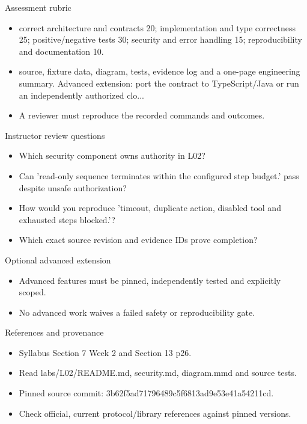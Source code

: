 \documentclass[aspectratio=169,10pt]{beamer}
\begin{document}
\begin{frame}{Assessment rubric}
\small
\begin{itemize}
\item correct architecture and contracts 20; implementation and type correctness 25; positive/negative tests 30; security and error handling 15; reproducibility and documentation 10.
\item source, fixture data, diagram, tests, evidence log and a one-page engineering summary. Advanced extension: port the contract to TypeScript/Java or run an independently authorized clo...
\item A reviewer must reproduce the recorded commands and outcomes.
\end{itemize}

\end{frame}

\begin{frame}{Instructor review questions}
\small
\begin{itemize}
\item Which security component owns authority in L02?
\item Can 'read-only sequence terminates within the configured step budget.' pass despite unsafe authorization?
\item How would you reproduce 'timeout, duplicate action, disabled tool and exhausted steps blocked.'?
\item Which exact source revision and evidence IDs prove completion?
\end{itemize}

\end{frame}

\begin{frame}{Optional advanced extension}
\small
\begin{itemize}
\item Advanced features must be pinned, independently tested and explicitly scoped.
\item No advanced work waives a failed safety or reproducibility gate.
\end{itemize}

\end{frame}

\begin{frame}{References and provenance}
\small
\begin{itemize}
\item Syllabus Section 7 Week 2 and Section 13 p26.
\item Read labs/L02/README.md, security.md, diagram.mmd and source tests.
\item Pinned source commit: 3b62f5ad71796489c5f6813ad9e53e41a54211cd.
\item Check official, current protocol/library references against pinned versions.
\end{itemize}

\end{frame}
\end{document}
